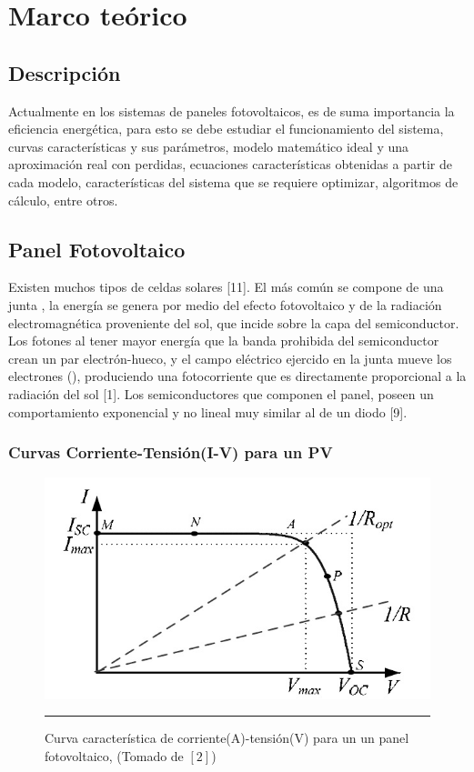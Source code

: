 \chapter{Marco teórico}
\label{ch:marco}

\section{Descripción}

Actualmente en los sistemas de paneles fotovoltaicos, es de suma importancia la eficiencia energética, para esto se debe estudiar el funcionamiento del sistema, curvas características y sus parámetros, modelo matemático ideal y una aproximación real con perdidas, ecuaciones características obtenidas a partir de cada modelo, características del sistema que se requiere optimizar, algoritmos de cálculo, entre otros.

\section{Panel Fotovoltaico}

Existen muchos tipos de celdas solares [11]. El más común se compone de una junta , la energía se genera por medio del efecto fotovoltaico y de la radiación electromagnética proveniente del sol, que incide sobre la capa del semiconductor. Los fotones al tener mayor energía que la banda prohibida del semiconductor crean un par electrón-hueco, y el campo eléctrico ejercido en la junta  mueve los electrones (), produciendo una fotocorriente que es directamente proporcional a la radiación del sol [1]. Los semiconductores que componen el panel, poseen un comportamiento exponencial y no lineal muy similar al de un diodo [9]. 

\subsection{Curvas Corriente-Tensión(I-V) para un PV }

\begin{figure}[H]
  \centering
    \includegraphics[scale=0.6]{./IV.jpg}
    \rule{35em}{0.5pt}
  \caption[Curva característica de corriente(A)-tensión(V) para un un panel fotovoltaico ]{Curva característica de corriente(A)-tensión(V) para un un panel fotovoltaico, (Tomado de $\left[2\right]$)}
  \label{fig:Curva_PV}
\end{figure}

